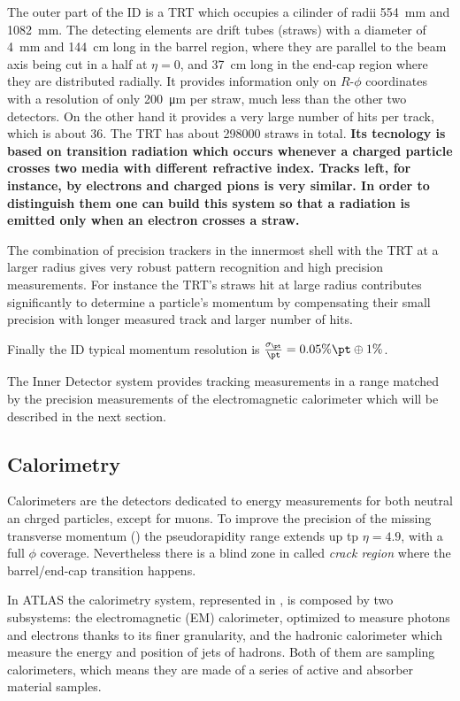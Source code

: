 The outer part of the ID is a TRT which occupies a cilinder of radii \SI{554}{\mm} and \SI{1082}{\mm}. The detecting elements are drift tubes (straws) with a diameter of \SI{4}{mm} and \SI{144}{cm} long in the barrel region, where they are parallel to the beam axis being cut in a half at $\eta =0$, and \SI{37}{\cm} long in the end-cap region where they are distributed radially. It provides information only on $R$-$\phi$ coordinates with a resolution of  only \SI{200}{\um} per straw, much less than the other two detectors. On the other hand it provides a very large number of hits per track, which is about \num{36}. The TRT has about \num{298000} straws in total. {\bfseries Its tecnology is based on transition radiation which occurs whenever a charged particle crosses two media with different refractive index. Tracks left, for instance, by electrons and charged pions is very similar. In order to distinguish them one can build this system so that a radiation is emitted only when an electron crosses a straw.}

The combination of precision trackers in the innermost shell with the TRT at a larger radius gives very robust pattern recognition and high precision measurements. For instance the TRT's straws hit at large radius contributes significantly to determine a particle's momentum by compensating their small precision with longer measured track and larger number of hits.

Finally the ID typical momentum resolution is $\frac{\sigma_{\pt}}{\pt}=0.05\%\pt\oplus1\%$.

The Inner Detector system provides tracking measurements in a range matched by the precision measurements of the electromagnetic calorimeter which will be described in the next section.

\subsection{Calorimetry}
\label{sec:calo}
Calorimeters are the detectors dedicated to energy measurements for both neutral an chrged particles, except for muons. To improve the precision of the missing transverse momentum (\met) the pseudorapidity range extends up tp $\eta=4.9$, with a full $\phi$ coverage. Nevertheless there is a blind zone in  called \emph{crack region} where the barrel/end-cap transition happens.

In ATLAS the calorimetry system, represented in \Fig{\ref{fig:Calos}}, is composed by two subsystems: the electromagnetic (EM) calorimeter, optimized to measure photons and electrons thanks to its finer granularity, and the hadronic calorimeter which measure the energy and position of jets of hadrons. Both of them are sampling calorimeters, which means they are made of a series of active and absorber material samples.

